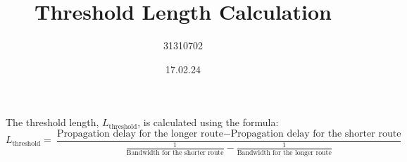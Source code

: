 \documentclass{article}
\begin{document}
\title{Threshold Length Calculation}
\author{31310702}
\date{17.02.24}

\maketitle

The threshold length, \( L_{\text{threshold}} \), is calculated using the formula:
\begin{equation}
L_{\text{threshold}} = \frac{\text{Propagation delay for the longer route} - \text{Propagation delay for the shorter route}}{\frac{1}{\text{Bandwidth for the shorter route}} - \frac{1}{\text{Bandwidth for the longer route}}}
\end{equation}
\end{document}
